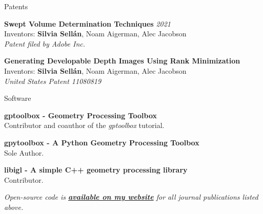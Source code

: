 \documentclass{resume} %
\begin{document}
\begin{rSection}{Patents}

{\bf Swept Volume Determination Techniques} \hfill {\em 2021} \\ 
Inventors: \textbf{Silvia Sellán}, Noam Aigerman, Alec Jacobson\\
{\it Patent filed by Adobe Inc.}

{\bf Generating Developable Depth Images Using Rank Minimization} \\ 
Inventors: \textbf{Silvia Sellán}, Noam Aigerman, Alec Jacobson\\
{\it United States Patent 11080819}

\end{rSection}

\begin{rSection}{Software}

{\bf gptoolbox - Geometry Processing Toolbox}  \\ 
Contributor and coauthor of the \textit{gptoolbox} tutorial.

{\bf gpytoolbox - A Python Geometry Processing Toolbox}  \\ 
Sole Author.

{\bf libigl - A simple C++ geometry processing library}\\ 
Contributor.

\textit{Open-source code is \href{http://dgp.toronto.edu/~sgsellan/}{\textbf{available on my website}} for all journal publications listed above.}

\end{rSection}
\end{document}
